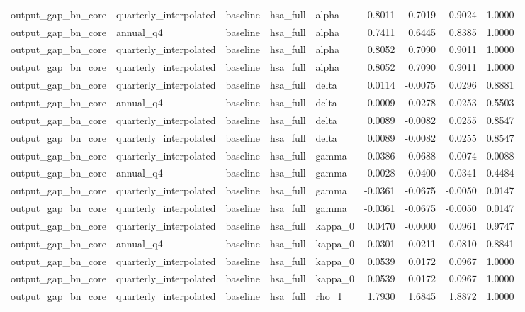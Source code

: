 \begin{tabular}{lllllrrrr}
output\_gap\_bn\_core & quarterly\_interpolated & baseline & hsa\_full & alpha & 0.8011 & 0.7019 & 0.9024 & 1.0000 \\
output\_gap\_bn\_core & annual\_q4 & baseline & hsa\_full & alpha & 0.7411 & 0.6445 & 0.8385 & 1.0000 \\
output\_gap\_bn\_core & quarterly\_interpolated & baseline & hsa\_full & alpha & 0.8052 & 0.7090 & 0.9011 & 1.0000 \\
output\_gap\_bn\_core & quarterly\_interpolated & baseline & hsa\_full & alpha & 0.8052 & 0.7090 & 0.9011 & 1.0000 \\
output\_gap\_bn\_core & quarterly\_interpolated & baseline & hsa\_full & delta & 0.0114 & -0.0075 & 0.0296 & 0.8881 \\
output\_gap\_bn\_core & annual\_q4 & baseline & hsa\_full & delta & 0.0009 & -0.0278 & 0.0253 & 0.5503 \\
output\_gap\_bn\_core & quarterly\_interpolated & baseline & hsa\_full & delta & 0.0089 & -0.0082 & 0.0255 & 0.8547 \\
output\_gap\_bn\_core & quarterly\_interpolated & baseline & hsa\_full & delta & 0.0089 & -0.0082 & 0.0255 & 0.8547 \\
output\_gap\_bn\_core & quarterly\_interpolated & baseline & hsa\_full & gamma & -0.0386 & -0.0688 & -0.0074 & 0.0088 \\
output\_gap\_bn\_core & annual\_q4 & baseline & hsa\_full & gamma & -0.0028 & -0.0400 & 0.0341 & 0.4484 \\
output\_gap\_bn\_core & quarterly\_interpolated & baseline & hsa\_full & gamma & -0.0361 & -0.0675 & -0.0050 & 0.0147 \\
output\_gap\_bn\_core & quarterly\_interpolated & baseline & hsa\_full & gamma & -0.0361 & -0.0675 & -0.0050 & 0.0147 \\
output\_gap\_bn\_core & quarterly\_interpolated & baseline & hsa\_full & kappa\_0 & 0.0470 & -0.0000 & 0.0961 & 0.9747 \\
output\_gap\_bn\_core & annual\_q4 & baseline & hsa\_full & kappa\_0 & 0.0301 & -0.0211 & 0.0810 & 0.8841 \\
output\_gap\_bn\_core & quarterly\_interpolated & baseline & hsa\_full & kappa\_0 & 0.0539 & 0.0172 & 0.0967 & 1.0000 \\
output\_gap\_bn\_core & quarterly\_interpolated & baseline & hsa\_full & kappa\_0 & 0.0539 & 0.0172 & 0.0967 & 1.0000 \\
output\_gap\_bn\_core & quarterly\_interpolated & baseline & hsa\_full & rho\_1 & 1.7930 & 1.6845 & 1.8872 & 1.0000 \\

\end{tabular}
